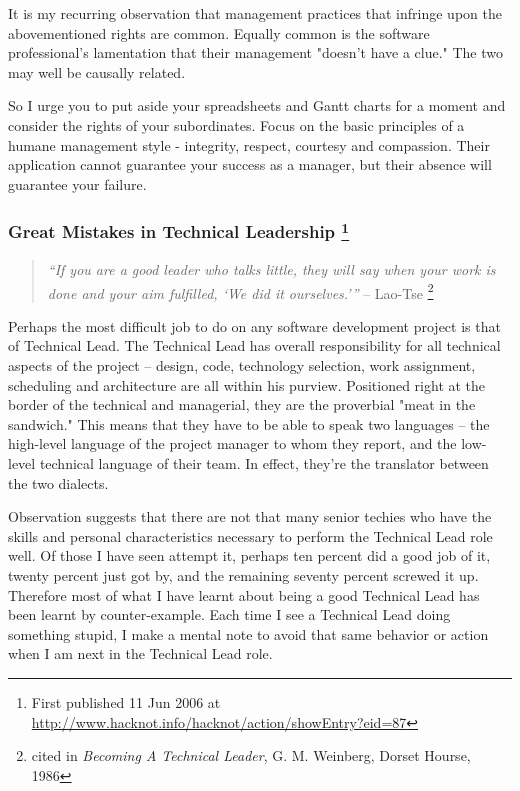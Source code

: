 \documentclass{article}
\begin{document}
\begin{enumerate}
It is my recurring observation that management practices that infringe
upon the abovementioned rights are common. Equally common is the
software professional's lamentation that their management "doesn't have
a clue." The two may well be causally related.

So I urge you to put aside your spreadsheets and Gantt charts for a
moment and consider the rights of your subordinates. Focus on the basic
principles of a humane management style - integrity, respect, courtesy
and compassion. Their application cannot guarantee your success as a
manager, but their absence will guarantee your failure.
\end{enumerate}

\subsubsection{Great Mistakes in Technical Leadership  \footnote{First published 11 Jun 2006 at
\url{http://www.hacknot.info/hacknot/action/showEntry?eid=87}}}
\label{sec:orgheadline162}

\begin{quote}
\emph{“If you are a good leader who talks little, they will say when your
work is done and your aim fulfilled, ‘We did it ourselves.'”} --
Lao-Tse  \footnote{cited in \emph{Becoming A Technical Leader}, G. M. Weinberg, Dorset
Hourse, 1986}
\end{quote}

Perhaps the most difficult job to do on any software development project
is that of Technical Lead. The Technical Lead has overall responsibility
for all technical aspects of the project -- design, code, technology
selection, work assignment, scheduling and architecture are all within
his purview. Positioned right at the border of the technical and
managerial, they are the proverbial "meat in the sandwich." This means
that they have to be able to speak two languages -- the high-level
language of the project manager to whom they report, and the low-level
technical language of their team. In effect, they're the translator
between the two dialects.

Observation suggests that there are not that many senior techies who
have the skills and personal characteristics necessary to perform the
Technical Lead role well. Of those I have seen attempt it, perhaps ten
percent did a good job of it, twenty percent just got by, and the
remaining seventy percent screwed it up. Therefore most of what I have
learnt about being a good Technical Lead has been learnt by
counter-example. Each time I see a Technical Lead doing something
stupid, I make a mental note to avoid that same behavior or action when
I am next in the Technical Lead role.
\end{document}
